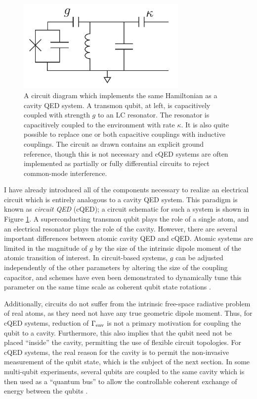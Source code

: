 \begin{figure}
\begin{center}
	\includegraphics[width = 3.25in]{scqb_chapter/cQED}
\end{center}
\caption[Circuit QED schematic]{A circuit diagram which implements the same Hamiltonian as a cavity QED system.  A transmon qubit, at left, is capacitively coupled with strength $g$ to an LC resonator.  The resonator is capacitively coupled to the environment with rate $\kappa$.  It is also quite possible to replace one or both capacitive couplings with inductive couplings.  The circuit as drawn contains an explicit ground reference, though this is not necessary and cQED systems are often implemented as partially or fully differential circuits to reject common-mode interference.}
\label{fig:cQED}
\end{figure}

I have already introduced all of the components necessary to realize an electrical circuit which is entirely analogous to a cavity QED system.  This paradigm is known as \textit{circuit QED} (cQED); a circuit schematic for such a system is shown in Figure \ref{fig:cQED}.  A superconducting transmon qubit plays the role of a single atom, and an electrical resonator plays the role of the cavity.  However, there are several important differences between atomic cavity QED and cQED.  Atomic systems are limited in the magnitude of $g$ by the size of the intrinsic dipole moment of the atomic transition of interest.  In circuit-based systems, $g$ can be adjusted independently of the other parameters by altering the size of the coupling capacitor, and schemes have even been demonstrated to dynamically tune this parameter on the same time scale as coherent qubit state rotations \cite{PhysRevB.84.184515}.

Additionally, circuits do not suffer from the intrinsic free-space radiative problem of real atoms, as they need not have any true geometric dipole moment.  Thus, for cQED systems, reduction of $\Gamma_{\rm env}$ is not a primary motivation for coupling the qubit to a cavity.  Furthermore, this also implies that the qubit need not be placed ``inside'' the cavity, permitting the use of flexible circuit topologies.  For cQED systems, the real reason for the cavity is to permit the non-invasive measurement of the qubit state, which is the subject of the next section.  In some multi-qubit experiments, several qubits are coupled to the same cavity which is then used as a ``quantum bus'' to allow the controllable coherent exchange of energy between the qubits \cite{Majer2007,Mariantoni2010}.

